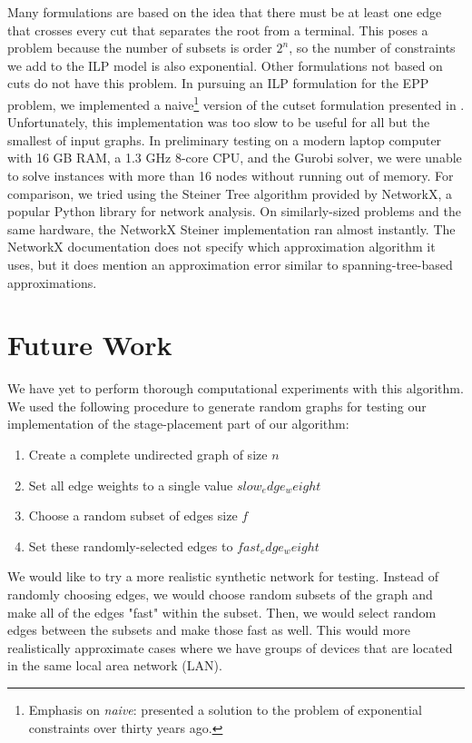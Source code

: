 \documentclass{article}
\begin{document}
 	Many formulations are based on the idea that there must be at least one edge that crosses every cut that separates the root from a terminal. This poses a problem because the number of subsets is order $2^n$, so the number of constraints we add to the ILP model is also exponential. Other formulations not based on cuts do not have this problem. In pursuing an ILP formulation for the EPP problem, we implemented a naive\footnote{Emphasis on \textit{naive}: \cite{Aneja1980AnIL} presented a solution to the problem of exponential constraints over thirty years ago.}  version of the cutset formulation presented in \cite{Koch1998SolvingST}. Unfortunately, this implementation was too slow to be useful for all but the smallest of input graphs. In preliminary testing on a modern laptop computer with 16 GB RAM, a 1.3 GHz 8-core CPU, and the Gurobi solver, we were unable to solve instances with more than 16 nodes without running out of memory. For comparison, we tried using the Steiner Tree algorithm provided by NetworkX, a popular Python library for network analysis\cite{networkx}. On similarly-sized problems and the same hardware, the NetworkX Steiner implementation ran almost instantly. The NetworkX documentation does not specify which approximation algorithm it uses, but it does mention an approximation error similar to spanning-tree-based approximations.
 	
 	\section{Future Work}
 	We have yet to perform thorough computational experiments with this algorithm. We used the following procedure to generate random graphs for testing our implementation of the stage-placement part of our algorithm:
 	\begin{enumerate}
 		\item Create a complete undirected graph of size $n$
 		\item Set all edge weights to a single value $slow_edge_weight$
 		\item Choose a random subset of edges size $f$
 		\item Set these randomly-selected edges to $fast_edge_weight$
 	\end{enumerate}
 	
 	We would like to try a more realistic synthetic network for testing. Instead of randomly choosing edges, we would choose random subsets of the graph and make all of the edges "fast" within the subset. Then, we would select random edges between the subsets and make those fast as well. This would more realistically approximate cases where we have groups of devices that are located in the same local area network (LAN).
 	
\end{document}
